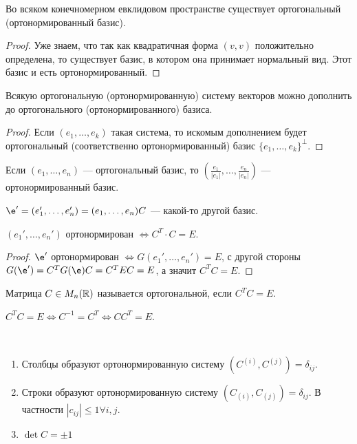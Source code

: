 \begin{Theorem}
  Во всяком конечномерном евклидовом пространстве существует ортогональный (ортонормированный базис).
\end{Theorem}

\begin{proof}
  Уже знаем, что так как квадратичная форма $(v, v)$ положительно определена, то существует базис, в котором она принимает нормальный вид. Этот базис и есть ортонормированный.
\end{proof}

\begin{Consequence}
  Всякую ортогональную (ортонормированную) систему векторов можно дополнить до ортогонального (ортонормированного) базиса.
\end{Consequence}

\begin{proof}
  Если $(e_1, \ldots, e_k)$ такая система, то искомым дополнением будет ортогональный (соответственно ортонормированный) базис $\{e_1, \ldots, e_k\}^{\perp}$.
\end{proof}

\begin{Note}
  Если $(e_1, \ldots, e_n)$ --- ортогональный базис, то $\displaystyle \left(\frac{e_1}{|e_1|}, \ldots, \frac{e_n}{|e_n|}\right)$ --- ортонормированный базис.
\end{Note}

$\e' = (e_1', \ldots, e_n') = (e_1, \ldots, e_n)C$ --- какой-то другой базис.

\begin{Suggestion}
  $ (e_1', \ldots, e_n')$ ортонормирован $\iff C^{T}\cdot C = E$.
\end{Suggestion}
\begin{proof}
  $\e'$ ортонормирован $\iff G(e_1', \ldots, e_n') = E$, с другой стороны $G(\e') = C^TG(\e)C = C^TEC = E$, а значит $C^TC = E$.
\end{proof}

\begin{Def}
  Матрица $C \in M_n(\mathbb{R})$ называется ортогональной, если $C^T C = E$.
\end{Def}

\begin{Note}
  $C^T C = E \iff C^{-1} = C^T \iff CC^T = E$.
\end{Note}

\begin{Properties}\
  \begin{enumerate}
    \item Столбцы образуют ортонормированную систему $(C^{(i)}, C^{(j)}) = \delta_{ij}$.
    \item Строки образуют ортонормированную систему $(C_{(i)}, C_{(j)}) = \delta_{ij}$. В частности $|c_{ij}| \leqslant 1 \forall i, j$.
    \item $\det C = \pm 1$
  \end{enumerate}
\end{Properties}

